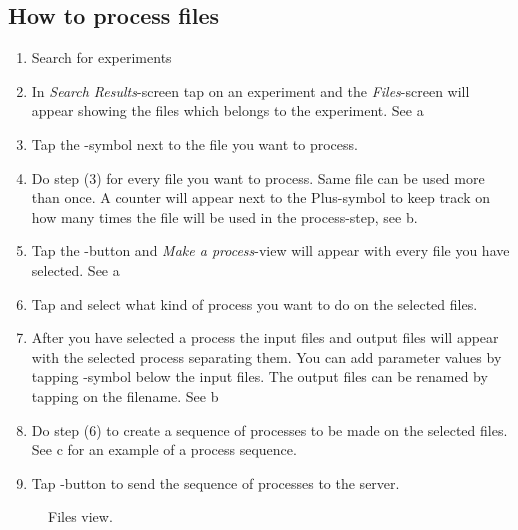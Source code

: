 \subsection{How to process files}


\begin{enumerate}
\item Search for experiments
\item In \emph{Search Results}-screen tap on an experiment and the \emph{Files}-screen will appear showing the files which belongs to the experiment. See a
\item Tap the -symbol next to the file you want to process.
\item Do step (3) for every file you want to process. Same file can be used more than once. A counter will appear next to the Plus-symbol to keep track on how many times the file will be used in the process-step, see b.
\item Tap the -button and \emph{Make a process}-view will appear with every file you have selected. See a
\item Tap  and select what kind of process you want to do on the selected files.
\item After you have selected a process the input files and output files will appear with the selected process separating them. You can add parameter values by tapping -symbol below the input files. The output files can be renamed by tapping on the filename. See b
\item Do step (6) to create a sequence of processes to be made on the selected files. See c for an example of a process sequence.

\item Tap -button to send the sequence of processes to the server.
\end{enumerate}


\begin{figure}[htb]
\caption{Files view.}
\label{fig:ios_files_view}
\end{figure}
\FloatBarrier

